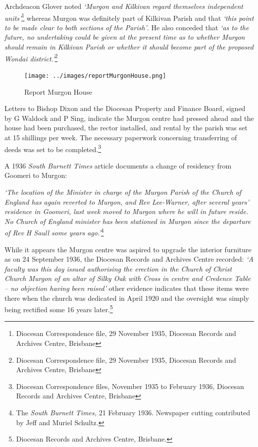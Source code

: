Archdeacon Glover noted \emph{`Murgon and Kilkivan regard themselves independent units'}\footnote{Diocesan Correspondence file, 29 November 1935, Diocesan Records and Archives Centre, Brisbane} whereas Murgon was definitely part of Kilkivan Parish and that \emph{`this point to be made clear to both sections of the Parish'}. He also conceded that \emph{`as to the future, no undertaking could be given at the present time as to whether Murgon should remain in Kilkivan Parish or whether it should become part of the proposed Wondai district.'}\footnote{Diocesan Correspondence file, 29 November 1935, Diocesan Records and Archives Centre, Brisbane}








\begin{figure}[!htb]
\begin{center}
\texttt{[image: ../images/reportMurgonHouse.png]}
\caption{Report Murgon House}
\end{center}
\end{figure}




Letters to Bishop Dixon and the Diocesan Property and Finance Board, signed by G Waldock and P Sing, indicate the Murgon centre had pressed ahead and the house had been purchased, the rector installed, and rental by the parish was set at 15 shillings per week. The necessary paperwork concerning transferring of deeds was set to be completed.\footnote{Diocesan Correspondence files, November 1935 to February 1936, Diocesan Records and Archives Centre, Brisbane}


A 1936 \emph{South Burnett Times} article documents a change of residency from Goomeri to Murgon:



\emph{`The location of the Minister in charge of the Murgon Parish of the Church of England has again reverted to Murgon, and Rev Lee-Warner, after several years' residence in Goomeri, last week moved to Murgon where he will in future reside. No Church of England minister has been stationed in Murgon since the departure of Rev H Saull some years ago.'}\footnote{The \emph{South Burnett Times,} 21 February 1936. Newspaper cutting contributed by Jeff and Muriel Schultz.}


\smallskip


While it appears the Murgon centre was aspired to upgrade the interior furniture as on 24 September 1936, the Diocesan Records and Archives Centre recorded: \emph{`A faculty was this day issued authorising the erection in the Church of Christ Church Murgon of an altar of Silky Oak with Cross in centre and Credence Table -- no objection having been raised'} other evidence indicates that these items were there when the church was dedicated in April 1920 and the oversight was simply being rectified some 16 years later.\footnote{Diocesan Records and Archives Centre, Brisbane.}


